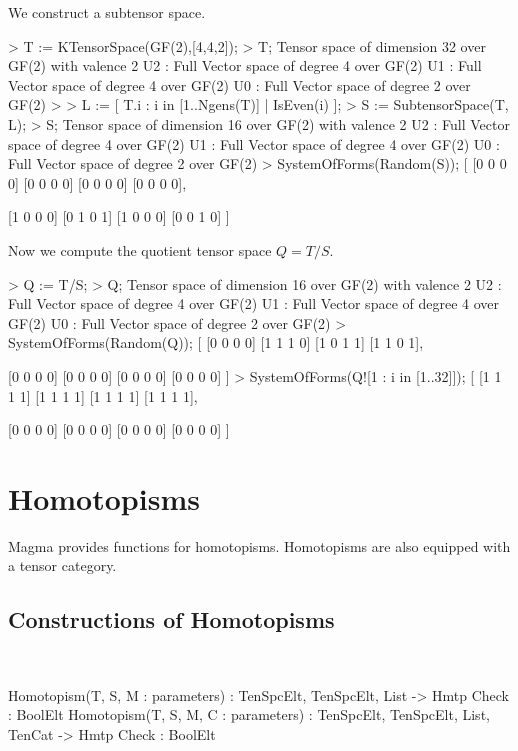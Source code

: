 \begin{example}
We construct a subtensor space.

\begin{code}
> T := KTensorSpace(GF(2),[4,4,2]);
> T;
Tensor space of dimension 32 over GF(2) with valence 2
U2 : Full Vector space of degree 4 over GF(2)
U1 : Full Vector space of degree 4 over GF(2)
U0 : Full Vector space of degree 2 over GF(2)
> 
> L := [ T.i : i in [1..Ngens(T)] | IsEven(i) ];
> S := SubtensorSpace(T, L);
> S;
Tensor space of dimension 16 over GF(2) with valence 2
U2 : Full Vector space of degree 4 over GF(2)
U1 : Full Vector space of degree 4 over GF(2)
U0 : Full Vector space of degree 2 over GF(2)
> SystemOfForms(Random(S));
[
    [0 0 0 0]
    [0 0 0 0]
    [0 0 0 0]
    [0 0 0 0],

    [1 0 0 0]
    [0 1 0 1]
    [1 0 0 0]
    [0 0 1 0]
]
\end{code}

Now we compute the quotient tensor space $Q=T/S$.

\begin{code}
> Q := T/S;
> Q;
Tensor space of dimension 16 over GF(2) with valence 2
U2 : Full Vector space of degree 4 over GF(2)
U1 : Full Vector space of degree 4 over GF(2)
U0 : Full Vector space of degree 2 over GF(2)
> SystemOfForms(Random(Q));
[
    [0 0 0 0]
    [1 1 1 0]
    [1 0 1 1]
    [1 1 0 1],

    [0 0 0 0]
    [0 0 0 0]
    [0 0 0 0]
    [0 0 0 0]
]
> SystemOfForms(Q![1 : i in [1..32]]);
[
    [1 1 1 1]
    [1 1 1 1]
    [1 1 1 1]
    [1 1 1 1],

    [0 0 0 0]
    [0 0 0 0]
    [0 0 0 0]
    [0 0 0 0]
]
\end{code}
\end{example}

\section{Homotopisms}

Magma provides functions for homotopisms. Homotopisms are also equipped with a tensor category.

\subsection{Constructions of Homotopisms}~

\begin{intrinsics}
Homotopism(T, S, M : parameters) : TenSpcElt, TenSpcElt, List -> Hmtp
    Check : BoolElt
Homotopism(T, S, M, C : parameters) : TenSpcElt, TenSpcElt, List, TenCat -> Hmtp
    Check : BoolElt
\end{intrinsics}

